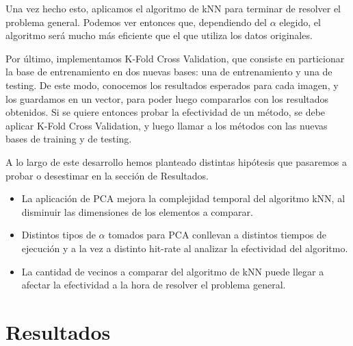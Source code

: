 \documentclass{article}
\begin{document}

Una vez hecho esto, aplicamos el algoritmo de kNN para terminar de resolver el problema general. Podemos ver entonces que, dependiendo del $\alpha$ elegido, el algoritmo será mucho más eficiente que el que utiliza los datos originales.

Por último, implementamos K-Fold Cross Validation, que consiste en particionar la base de entrenamiento en dos nuevas bases: una de entrenamiento y una de testing. De este modo, conocemos los resultados esperados para cada imagen, y los guardamos en un vector, para poder luego compararlos con los resultados obtenidos. Si se quiere entonces probar la efectividad de un método, se debe aplicar K-Fold Cross Validation, y luego llamar a los métodos con las nuevas bases de training y de testing.






A lo largo de este desarrollo hemos planteado distintas hipótesis que pasaremos a probar o desestimar en la sección de Resultados.
\begin{itemize}
  \item La aplicación de PCA mejora la complejidad temporal del algoritmo kNN, al disminuir las dimensiones de los elementos a comparar. 
  \item Distintos tipos de $\alpha$ tomados para PCA conllevan a distintos tiempos de ejecución y a la vez a distinto hit-rate al analizar la efectividad del algoritmo.
  \item La cantidad de vecinos a comparar del algoritmo de kNN puede llegar a afectar la efectividad a la hora de resolver el problema general.
  \end{itemize}
  
  
 

\section*{Resultados}{}
\end{document}
